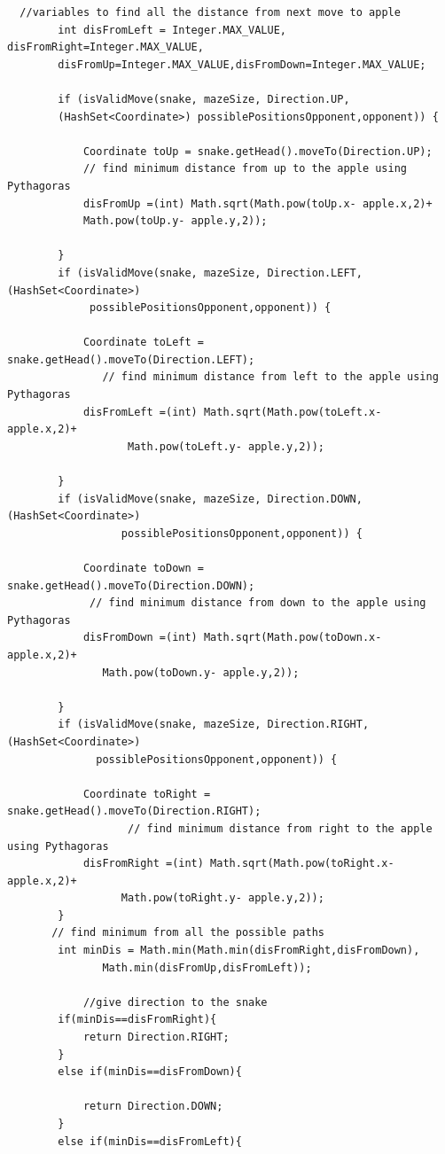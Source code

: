 \documentclass[a4paper,12pt]{article}
\begin{document}
\begin{verbatim}
  //variables to find all the distance from next move to apple
        int disFromLeft = Integer.MAX_VALUE, disFromRight=Integer.MAX_VALUE,
		disFromUp=Integer.MAX_VALUE,disFromDown=Integer.MAX_VALUE;

        if (isValidMove(snake, mazeSize, Direction.UP, 
		(HashSet<Coordinate>) possiblePositionsOpponent,opponent)) {

            Coordinate toUp = snake.getHead().moveTo(Direction.UP);
            // find minimum distance from up to the apple using Pythagoras
            disFromUp =(int) Math.sqrt(Math.pow(toUp.x- apple.x,2)+
			Math.pow(toUp.y- apple.y,2));

        }
        if (isValidMove(snake, mazeSize, Direction.LEFT,(HashSet<Coordinate>) 
		     possiblePositionsOpponent,opponent)) {

            Coordinate toLeft = snake.getHead().moveTo(Direction.LEFT);
               // find minimum distance from left to the apple using Pythagoras
            disFromLeft =(int) Math.sqrt(Math.pow(toLeft.x- apple.x,2)+
			       Math.pow(toLeft.y- apple.y,2));

        }
        if (isValidMove(snake, mazeSize, Direction.DOWN,(HashSet<Coordinate>) 
		          possiblePositionsOpponent,opponent)) {

            Coordinate toDown = snake.getHead().moveTo(Direction.DOWN);
             // find minimum distance from down to the apple using Pythagoras
            disFromDown =(int) Math.sqrt(Math.pow(toDown.x- apple.x,2)+
			   Math.pow(toDown.y- apple.y,2));

        }
        if (isValidMove(snake, mazeSize, Direction.RIGHT,(HashSet<Coordinate>)
		      possiblePositionsOpponent,opponent)) {

            Coordinate toRight = snake.getHead().moveTo(Direction.RIGHT);
                   // find minimum distance from right to the apple using Pythagoras
            disFromRight =(int) Math.sqrt(Math.pow(toRight.x- apple.x,2)+
			      Math.pow(toRight.y- apple.y,2));
        }
       // find minimum from all the possible paths
        int minDis = Math.min(Math.min(disFromRight,disFromDown),
		       Math.min(disFromUp,disFromLeft));
            
            //give direction to the snake
        if(minDis==disFromRight){
            return Direction.RIGHT;
        } 
        else if(minDis==disFromDown){

            return Direction.DOWN;
        }
        else if(minDis==disFromLeft){


\end{verbatim}
\end{document}
